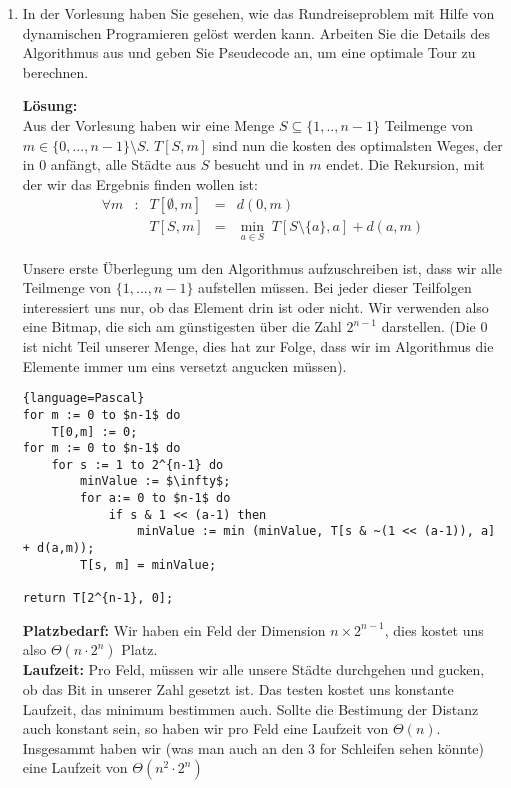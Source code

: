 \documentclass[11pt,a4paper,ngerman]{article}
\begin{document}
\begin{enumerate}[\bfseries (a)]
\item In der Vorlesung haben Sie gesehen, wie das Rundreiseproblem mit Hilfe von dynamischen Programieren gelöst werden kann. Arbeiten Sie die Details des Algorithmus aus und geben Sie Pseudecode an, um eine optimale Tour zu berechnen.

\pagebreak

\textbf{Lösung:}\\

Aus der Vorlesung haben wir eine Menge $S \subseteq \{1,..,n-1 \}$ Teilmenge von $m \in \{ 0, ... , n-1\} \setminus S$. $T[S , m]$ sind nun die kosten des optimalsten Weges, der in 0 anfängt, alle Städte aus $S$ besucht und in $m$ endet. Die Rekursion, mit der wir das Ergebnis finden wollen ist:
$$
\begin{array}{lcrcl}
\forall m &:& T[\emptyset , m] &=& d(0,m)\\
&& T[ S,m ] &=& \underset{a\in S}{\min} \; T[S \setminus \{ a \} , a] + d(a,m)
\end{array}
$$

Unsere erste Überlegung um den Algorithmus aufzuschreiben ist, dass wir alle Teilmenge von $\{ 1, ... , n-1 \}$ aufstellen müssen. Bei jeder dieser Teilfolgen interessiert uns nur, ob das Element drin ist oder nicht. Wir verwenden also eine Bitmap, die sich am günstigesten über die Zahl $2^{n-1}$ darstellen. (Die 0 ist nicht Teil unserer Menge, dies hat zur Folge, dass wir im Algorithmus die Elemente immer um eins versetzt angucken müssen).

\begin{lstlisting}{language=Pascal}
for m := 0 to $n-1$ do
	T[0,m] := 0;
for m := 0 to $n-1$ do
	for s := 1 to 2^{n-1} do
		minValue := $\infty$;
		for a:= 0 to $n-1$ do
			if s & 1 << (a-1) then
				minValue := min (minValue, T[s & ~(1 << (a-1)), a] + d(a,m));
		T[s, m] = minValue;

return T[2^{n-1}, 0];
\end{lstlisting}

\textbf{Platzbedarf:} Wir haben ein Feld der Dimension $n \times 2^{n-1}$, dies kostet uns also $\Theta (n \cdot 2^n)$ Platz.\\
\textbf{Laufzeit:} Pro Feld, müssen wir alle unsere Städte durchgehen und gucken, ob das Bit in unserer Zahl gesetzt ist. Das testen kostet uns konstante Laufzeit, das minimum bestimmen auch. Sollte die Bestimung der Distanz auch konstant sein, so haben wir pro Feld eine Laufzeit von $\Theta (n)$.\\
Insgesammt haben wir (was man auch an den 3 for Schleifen sehen könnte) eine Laufzeit von $\Theta (n^2 \cdot 2^n)$

\end{enumerate}
\end{document}
